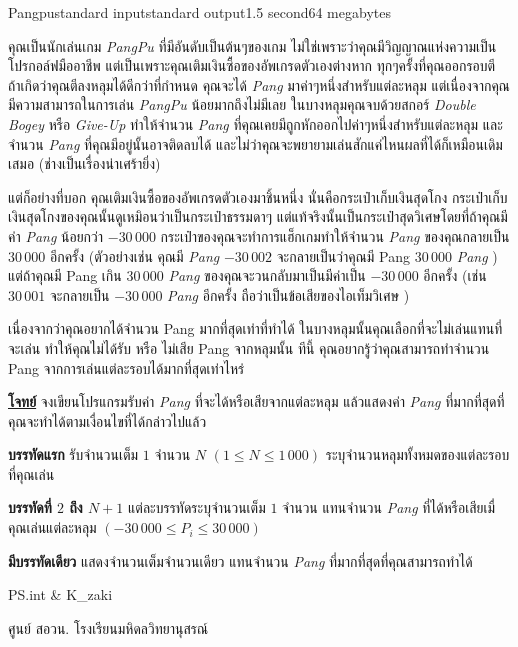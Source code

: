 \documentclass[11pt,a4paper]{article}
\begin{document}
\begin{problem}{Pangpu}{standard input}{standard output}{1.5 second}{64 megabytes}

คุณเป็นนักเล่นเกม \textit{PangPu} ที่มีอันดับเป็นต้นๆของเกม  ไม่ใช่เพราะว่าคุณมีวิญญาณแห่งความเป็นโปรกอล์ฟมืออาชีพ แต่เป็นเพราะคุณเติมเงินซื้อของอัพเกรดตัวเองต่างหาก ทุกๆครั้งที่คุณออกรอบตี ถ้าเกิดว่าคุณตีลงหลุมได้ดีกว่าที่กำหนด คุณจะได้ \textit{Pang} มาค่าๆหนึ่งสำหรับแต่ละหลุม แต่เนื่องจากคุณมีความสามารถในการเล่น \textit{PangPu} น้อยมากถึงไม่มีเลย ในบางหลุมคุณจบด้วยสกอร์ \textit{Double Bogey} หรือ \textit{Give-Up} ทำให้จำนวน \textit{Pang} ที่คุณเคยมีถูกหักออกไปค่าๆหนึ่งสำหรับแต่ละหลุม และจำนวน \textit{Pang} ที่คุณมีอยู่นั้นอาจติดลบได้ และไม่ว่าคุณจะพยายามเล่นสักแค่ไหนผลที่ได้ก็เหมือนเดิมเสมอ (ช่างเป็นเรื่องน่าเศร้ายิ่ง)

แต่ก็อย่างที่บอก คุณเติมเงินซื้อของอัพเกรดตัวเองมาชิ้นหนึ่ง นั่นคือกระเป๋าเก็บเงินสุดโกง กระเป๋าเก็บเงินสุดโกงของคุณนั้นดูเหมิอนว่าเป็นกระเป๋าธรรมดาๆ แต่แท้จริงนั้นเป็นกระเป๋าสุดวิเศษโดยที่ถ้าคุณมีค่า \textit{Pang} น้อยกว่า $-30\,000$ กระเป๋าของคุณจะทำการแฮ็กเกมทำให้จำนวน \textit{Pang} ของคุณกลายเป็น $30\,000$ อีกครั้ง (ตัวอย่างเช่น คุณมี \textit{Pang}          $-30\,002$ จะกลายเป็นว่าคุณมี Pang $30\,000$ \textit{Pang} ) แต่ถ้าคุณมี Pang เกิน $30\,000$ \textit{Pang} ของคุณจะวนกลับมาเป็นมีค่าเป็น $-30\,000$ อีกครั้ง (เช่น $30\,001$ จะกลายเป็น $-30\,000$ \textit{Pang} อีกครั้ง ถือว่าเป็นข้อเสียของไอเท็มวิเศษ )

                เนื่องจากว่าคุณอยากได้จำนวน Pang มากที่สุดเท่าที่ทำได้ ในบางหลุมนั้นคุณเลือกที่จะไม่เล่นแทนที่จะเล่น ทำให้คุณไม่ได้รับ หรือ ไม่เสีย Pang  จากหลุมนั้น ทีนี้ คุณอยากรู้ว่าคุณสามารถทำจำนวน Pang จากการเล่นแต่ละรอบได้มากที่สุดเท่าไหร่

\bigskip
\underline{\textbf{โจทย์}}  จงเขียนโปรแกรมรับค่า \textit{Pang} ที่จะได้หรือเสียจากแต่ละหลุม แล้วแสดงค่า \textit{Pang} ที่มากที่สุดที่คุณจะทำได้ตามเงื่อนไขที่ได้กล่าวไปแล้ว


\InputFile

\textbf{บรรทัดแรก} รับจำนวนเต็ม $1$ จำนวน $N$ $(1 \leq N \leq 1\,000)$ ระบุจำนวนหลุมทั้งหมดของแต่ละรอบที่คุณเล่น

\textbf{บรรทัดที่ $2$ ถึง $N+1$} แต่ละบรรทัดระบุจำนวนเต็ม $1$ จำนวน แทนจำนวน \textit{Pang} ที่ได้หรือเสียเมื่คุณเล่นแต่ละหลุม $(-30\,000 \leq P_i \leq 30\,000)$


\OutputFile

\textbf{มีบรรทัดเดียว} แสดงจำนวนเต็มจำนวนเดียว แทนจำนวน \textit{Pang} ที่มากที่สุดที่คุณสามารถทำได้

\Examples

\begin{example}
%
\end{example}


\Source

PS.int \& K\_zaki

ศูนย์ สอวน. โรงเรียนมหิดลวิทยานุสรณ์

\end{problem}
\end{document}
